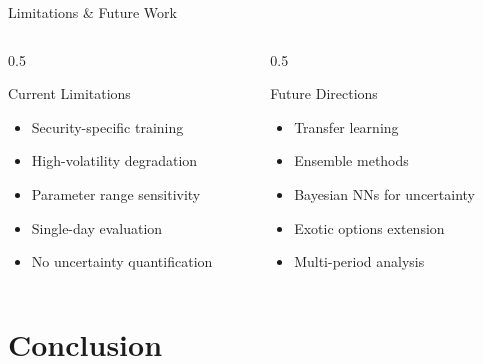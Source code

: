 \documentclass{beamer}
\begin{document}
\begin{frame}{Limitations \& Future Work}
    \begin{columns}
        \begin{column}{0.5\textwidth}
            \begin{block}{Current Limitations}
                \small
                \begin{itemize}
                    \item Security-specific training
                    \item High-volatility degradation
                    \item Parameter range sensitivity
                    \item Single-day evaluation
                    \item No uncertainty quantification
                \end{itemize}
            \end{block}
        \end{column}
        \begin{column}{0.5\textwidth}
            \begin{block}{Future Directions}
                \small
                \begin{itemize}
                    \item Transfer learning
                    \item Ensemble methods
                    \item Bayesian NNs for uncertainty
                    \item Exotic options extension
                    \item Multi-period analysis
                \end{itemize}
            \end{block}
        \end{column}
    \end{columns}
\end{frame}

\section{Conclusion}
\end{document}
